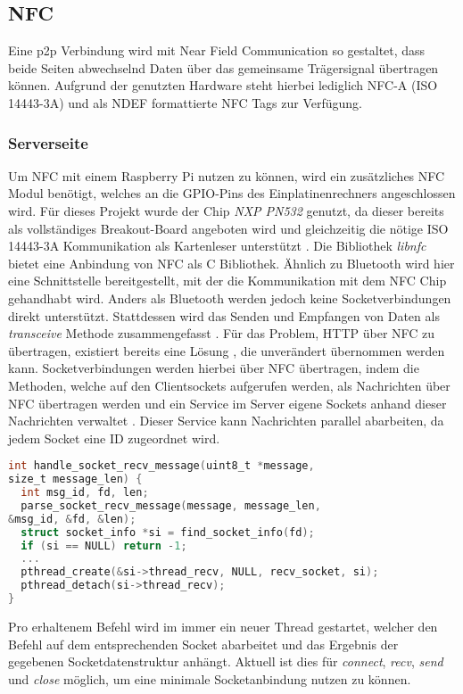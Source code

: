     \subsection{NFC}
        Eine p2p Verbindung wird mit Near Field Communication so gestaltet, dass beide Seiten abwechselnd Daten über das gemeinsame Trägersignal übertragen können.  Aufgrund der genutzten Hardware steht hierbei lediglich NFC-A (ISO 14443-3A) und als NDEF formattierte NFC Tags zur Verfügung.
        
    \subsubsection{Serverseite}
	    Um NFC mit einem Raspberry Pi nutzen zu können, wird ein zusätzliches NFC Modul benötigt, welches an die GPIO-Pins des Einplatinenrechners angeschlossen wird. Für dieses Projekt wurde der Chip {\it NXP PN532} genutzt, da dieser bereits als vollständiges Breakout-Board angeboten wird und gleichzeitig die nötige ISO 14443-3A Kommunikation als Kartenleser unterstützt \cite{nxpChip}.
	    Die Bibliothek {\it libnfc} bietet eine Anbindung von NFC als C Bibliothek. Ähnlich zu Bluetooth wird hier eine Schnittstelle bereitgestellt, mit der die Kommunikation mit dem NFC Chip gehandhabt wird. Anders als Bluetooth werden jedoch keine Socketverbindungen direkt unterstützt. Stattdessen wird das Senden und Empfangen von Daten als {\it transceive} Methode zusammengefasst \cite{libnfc}.
	    Für das Problem, HTTP über NFC zu übertragen, existiert bereits eine Lösung \cite{nfcSocketsBlog}, die unverändert übernommen werden kann. Socketverbindungen werden hierbei über NFC übertragen, indem die Methoden, welche auf den Clientsockets aufgerufen werden, als Nachrichten über NFC übertragen werden und ein Service im Server eigene Sockets anhand dieser Nachrichten verwaltet \cite{nfcSocketsBlog}. Dieser Service kann Nachrichten parallel abarbeiten, da jedem Socket eine ID zugeordnet wird. 
	    \begin{lstlisting}[frame=bt, label={lst:nfc:recv}, language=C, caption=Datenempfang über NFC (Servercode in C) \cite{nfcSockets}]
int handle_socket_recv_message(uint8_t *message,
size_t message_len) {
  int msg_id, fd, len;
  parse_socket_recv_message(message, message_len,
&msg_id, &fd, &len);
  struct socket_info *si = find_socket_info(fd);
  if (si == NULL) return -1;
  ...
  pthread_create(&si->thread_recv, NULL, recv_socket, si);
  pthread_detach(si->thread_recv);
}
        \end{lstlisting}
	    Pro erhaltenem Befehl wird im  immer ein neuer Thread gestartet, welcher den Befehl auf dem entsprechenden Socket abarbeitet und das Ergebnis der gegebenen Socketdatenstruktur anhängt. Aktuell ist dies für {\it connect}, {\it recv}, {\it send} und {\it close} möglich, um eine minimale Socketanbindung nutzen zu können.
